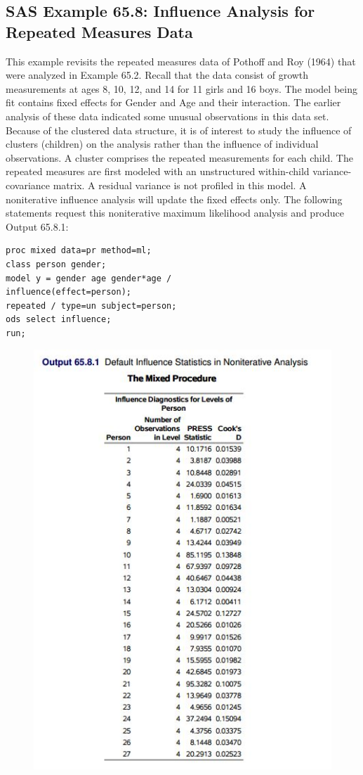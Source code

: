 \documentclass[a4paper,12pt]{article}
\begin{document}
\subsection{SAS Example 65.8: Influence Analysis for Repeated Measures Data}
This example revisits the repeated measures data of Pothoff and Roy (1964) that were analyzed in Example
65.2. Recall that the data consist of growth measurements at ages 8, 10, 12, and 14 for 11 girls and 16
boys. The model being fit contains fixed effects for Gender and Age and their interaction.
The earlier analysis of these data indicated some unusual observations in this data set. Because of the
clustered data structure, it is of interest to study the influence of clusters (children) on the analysis rather than
the influence of individual observations. A cluster comprises the repeated measurements for each child.
The repeated measures are first modeled with an unstructured within-child variance-covariance matrix.
A residual variance is not profiled in this model. A noniterative influence analysis will update the fixed
effects only. The following statements request this noniterative maximum likelihood analysis and produce
Output 65.8.1:

\begin{verbatim}
proc mixed data=pr method=ml;
class person gender;
model y = gender age gender*age /
influence(effect=person);
repeated / type=un subject=person;
ods select influence;
run;

\end{verbatim}
\begin{figure}[h!]
\centering
\includegraphics[width=0.7\linewidth]{images/SASoutput}
\caption{}
\label{fig:SASoutput}
\end{figure}
\end{document}
